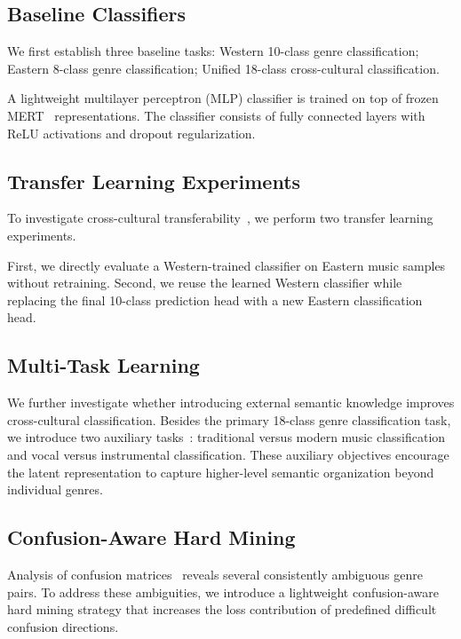 \documentclass{article}
\begin{document}
\subsection{Baseline Classifiers}
We first establish three baseline tasks: Western 10-class genre classification; Eastern 8-class genre classification; Unified 18-class cross-cultural classification.

A lightweight multilayer perceptron (MLP) classifier is trained on top of frozen MERT~\cite{li2024mert} representations. The classifier consists of fully connected layers with ReLU activations and dropout regularization.

\subsection{Transfer Learning Experiments}

To investigate cross-cultural transferability~\cite{pan2009survey, choi2017transfer}, we perform two transfer learning experiments.

First, we directly evaluate a Western-trained classifier on Eastern music samples without retraining. Second, we reuse the learned Western classifier while replacing the final 10-class prediction head with a new Eastern classification head.

\subsection{Multi-Task Learning}

We further investigate whether introducing external semantic knowledge improves cross-cultural classification. Besides the primary 18-class genre classification task, we introduce two auxiliary tasks~\cite{ruder2017overview}: traditional versus modern music classification and vocal versus instrumental classification. These auxiliary objectives encourage the latent representation to capture higher-level semantic organization beyond individual genres.

\subsection{Confusion-Aware Hard Mining}

Analysis of confusion matrices~\cite{susmaga2004confusion} reveals several consistently ambiguous genre pairs. To address these ambiguities, we introduce a lightweight confusion-aware hard mining strategy that increases the loss contribution of predefined difficult confusion directions.
\end{document}
